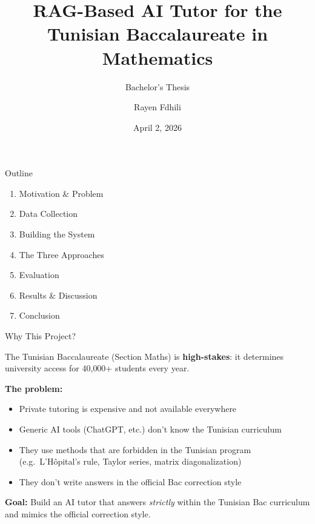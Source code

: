 \documentclass[aspectratio=169, 11pt]{beamer}
\title{RAG-Based AI Tutor for the\\Tunisian Baccalaureate in Mathematics}
\subtitle{Bachelor's Thesis}
\author{Rayen Fdhili}
\institute{Technical University of Munich\\
Supervisor: Frederic Mrozinski \quad Professor: Apl.\ Prof.\ Dr.\ Georg Groh}
\date{April 2, 2026}
\begin{document}
\begin{frame}[plain]
\maketitle
\end{frame}


\begin{frame}{Outline}
\begin{enumerate}
    \item Motivation \& Problem
    \item Data Collection
    \item Building the System
    \item The Three Approaches
    \item Evaluation
    \item Results \& Discussion
    \item Conclusion
\end{enumerate}
\end{frame}


\begin{frame}{Why This Project?}

The Tunisian Baccalaureate (Section Maths) is \textbf{high-stakes}: it determines
university access for 40{,}000+ students every year.

\bigskip

\textbf{The problem:}
\begin{itemize}
    \item Private tutoring is expensive and not available everywhere
    \item Generic AI tools (ChatGPT, etc.) don't know the Tunisian curriculum
    \item They use methods that are \alert{forbidden} in the Tunisian program \\
          (e.g.\ L'H\^opital's rule, Taylor series, matrix diagonalization)
    \item They don't write answers in the official Bac correction style
\end{itemize}

\bigskip

\textbf{Goal:} Build an AI tutor that answers \textit{strictly} within the
Tunisian Bac curriculum and mimics the official correction style.

\end{frame}
\end{document}
